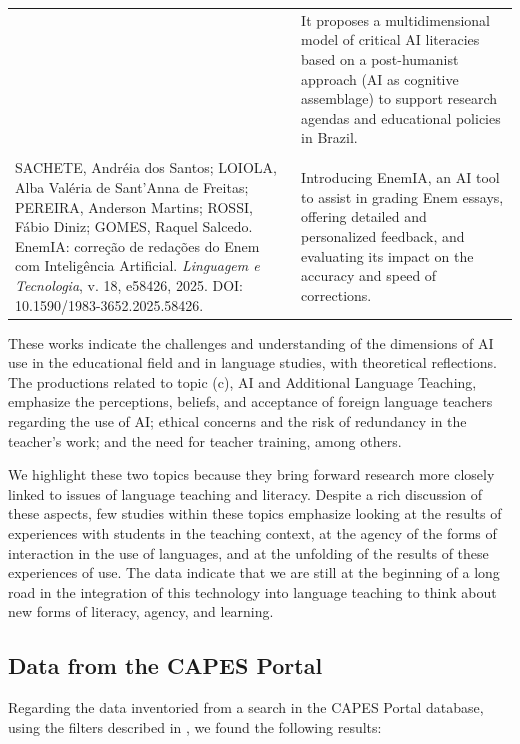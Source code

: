 \documentclass[english]{textolivre}
\begin{document}
\begin{table}[htbp]
\begin{threeparttable}
\begin{tabular}{
  >{\raggedright\arraybackslash}p{7cm}
  >{\raggedright\arraybackslash}p{7cm}
  }
&
It proposes a multidimensional model of critical AI literacies based on a post-humanist approach (AI as cognitive assemblage) to support research agendas and educational policies in Brazil.
\\
\\[-10pt]
SACHETE, Andréia dos Santos; LOIOLA, Alba Valéria de Sant'Anna de Freitas; PEREIRA, Anderson Martins; ROSSI, Fábio Diniz; GOMES, Raquel Salcedo. EnemIA: correção de redações do Enem com Inteligência Artificial. \textit{Linguagem e Tecnologia}, v. 18, e58426, 2025. DOI: 10.1590/1983-3652.2025.58426.
&
Introducing EnemIA, an AI tool to assist in grading Enem essays, offering detailed and personalized feedback, and evaluating its impact on the accuracy and speed of corrections.
\\
\bottomrule
\end{tabular}
\end{threeparttable}
\end{table}

These works indicate the challenges and understanding of the dimensions of AI use in the educational field and in language studies, with theoretical reflections. The productions related to topic (c), AI and Additional Language Teaching, emphasize the perceptions, beliefs, and acceptance of foreign language teachers regarding the use of AI; ethical concerns and the risk of redundancy in the teacher’s work; and the need for teacher training, among others.

We highlight these two topics because they bring forward research more closely linked to issues of language teaching and literacy. Despite a rich discussion of these aspects, few studies within these topics emphasize looking at the results of experiences with students in the teaching context, at the agency of the forms of interaction in the use of languages, and at the unfolding of the results of these experiences of use. The data indicate that we are still at the beginning of a long road in the integration of this technology into language teaching to think about new forms of literacy, agency, and learning.

\subsection{Data from the CAPES Portal}\label{sec-conduta}
Regarding the data inventoried from a search in the CAPES Portal database, using the filters described in , we found the following results:
\end{document}
